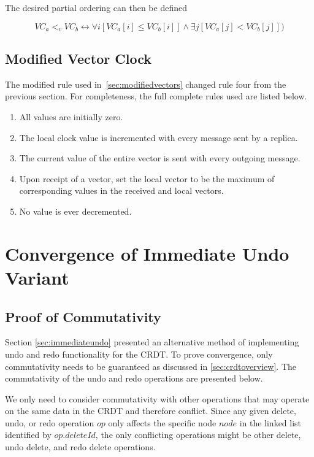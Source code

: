\documentclass[12pt,a4paper,twoside,openright]{report}
\begin{document}
The desired partial ordering can then be defined

\[VC_a <_v VC_b \leftrightarrow \forall i[VC_a[i] \leq VC_b[i]] \land \exists j[VC_a[j] < VC_b[j]])\]



\section{Modified Vector Clock}
\label{appendix:modifiedvector}

The modified rule used in~\cref{sec:modifiedvectors} changed rule four from the previous section. For completeness, the full complete rules used are listed below.

\begin{enumerate}
	\item All values are initially zero.
	\item The local clock value is incremented with every message sent by a replica.
	\item The current value of the entire vector is sent with every outgoing message.
	\item Upon receipt of a vector, set the local vector to be the maximum of corresponding values in the received and local vectors.
	\item No value is ever decremented.
\end{enumerate}




\chapter{Convergence of Immediate Undo Variant}

\section{Proof of Commutativity} \label{appendix:immundoproof}

Section \cref{sec:immediateundo} presented an alternative method of implementing undo and redo functionality for the CRDT. To prove convergence, only commutativity needs to be guaranteed as discussed in \cref{sec:crdtoverview}. The commutativity of the undo and redo operations are presented below.

We only need to consider commutativity with other operations that may operate on the same data in the CRDT and therefore conflict. Since any given delete, undo, or redo operation $op$ only affects the specific node $node$ in the linked list identified by $op.deleteId$, the only conflicting operations might be other delete, undo delete, and redo delete operations.
						
\end{document}
